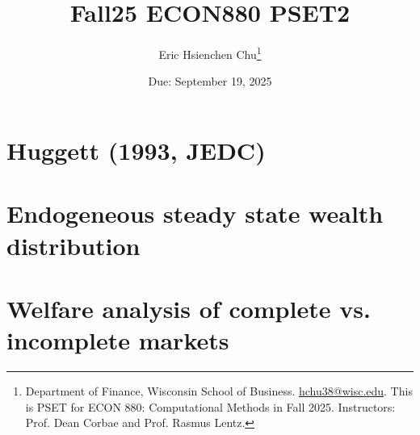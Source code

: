 \documentclass[12pt]{article}
\title{\huge Fall25 ECON880 PSET2}
\author{\Large Eric Hsienchen Chu\footnote{Department of Finance, Wisconsin School of Business. 
\href{mailto:hchu38@wisc.edu}{hchu38@wisc.edu}. 
This is PSET for ECON 880: Computational Methods in Fall 2025. 
Instructors: Prof. Dean Corbae and Prof. Rasmus Lentz.}}
\numberwithin{equation}{section}
\begin{document}
\date{\Large Due: September 19, 2025}
\maketitle
\renewcommand{\cftdot}{.}


\vspace{-4ex}

\section{Huggett (1993, JEDC)}



\section{Endogeneous steady state wealth distribution}


\newpage
\section{Welfare analysis of complete vs. incomplete markets}





\newpage
\printbibliography
\end{document}
